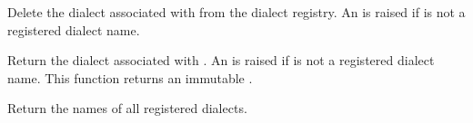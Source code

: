 \documentclass[letterpaper,10pt,english]{sphinxmanual}
\begin{document}

\begin{fulllineitems}
\label{\detokenize{csv:csv.unregister_dialect}}
Delete the dialect associated with  from the dialect registry.  An
{\hyperref[\detokenize{csv:csv.Error}]{}} is raised if  is not a registered dialect name.

\end{fulllineitems}


\begin{fulllineitems}
\label{\detokenize{csv:csv.get_dialect}}
Return the dialect associated with .  An {\hyperref[\detokenize{csv:csv.Error}]{}} is raised if
 is not a registered dialect name.  This function returns an immutable
{\hyperref[\detokenize{csv:csv.Dialect}]{}}.

\end{fulllineitems}


\begin{fulllineitems}
\label{\detokenize{csv:csv.list_dialects}}
Return the names of all registered dialects.

\end{fulllineitems}
\end{document}
